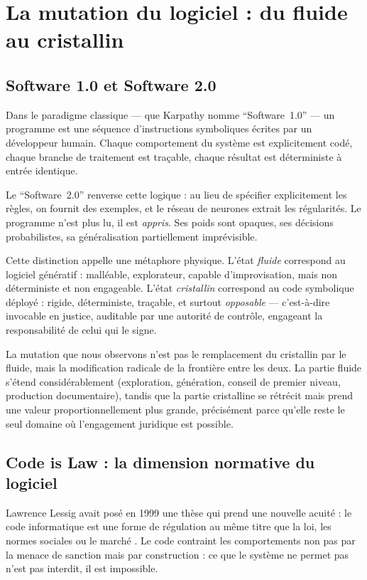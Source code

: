 \documentclass[12pt,a4paper]{article}
\begin{document}
\section{La mutation du logiciel : du fluide au cristallin}

\subsection{Software 1.0 et Software 2.0}

Dans le paradigme classique --- que Karpathy nomme \enquote{Software~1.0} --- un programme est une séquence d'instructions symboliques écrites par un développeur humain. Chaque comportement du système est explicitement codé, chaque branche de traitement est traçable, chaque résultat est déterministe à entrée identique.

Le \enquote{Software~2.0} renverse cette logique : au lieu de spécifier explicitement les règles, on fournit des exemples, et le réseau de neurones extrait les régularités. Le programme n'est plus lu, il est \emph{appris}. Ses poids sont opaques, ses décisions probabilistes, sa généralisation partiellement imprévisible.

Cette distinction appelle une métaphore physique. L'état \emph{fluide} correspond au logiciel génératif : malléable, explorateur, capable d'improvisation, mais non déterministe et non engageable. L'état \emph{cristallin} correspond au code symbolique déployé : rigide, déterministe, traçable, et surtout \emph{opposable} --- c'est-à-dire invocable en justice, auditable par une autorité de contrôle, engageant la responsabilité de celui qui le signe.

La mutation que nous observons n'est pas le remplacement du cristallin par le fluide, mais la modification radicale de la frontière entre les deux. La partie fluide s'étend considérablement (exploration, génération, conseil de premier niveau, production documentaire), tandis que la partie cristalline se rétrécit mais prend une valeur proportionnellement plus grande, précisément parce qu'elle reste le seul domaine où l'engagement juridique est possible.

\subsection{Code is Law : la dimension normative du logiciel}

Lawrence Lessig avait posé en 1999 une thèse qui prend une nouvelle acuité : le code informatique est une forme de régulation au même titre que la loi, les normes sociales ou le marché \parencite{lessig1999}. Le code contraint les comportements non pas par la menace de sanction mais par construction : ce que le système ne permet pas n'est pas interdit, il est impossible.
\end{document}
